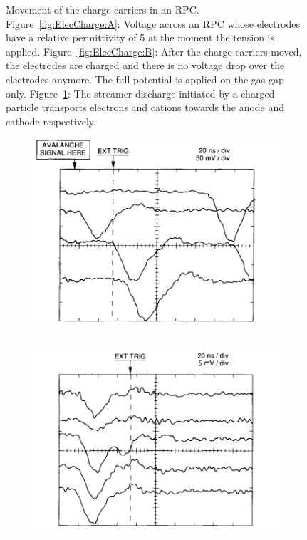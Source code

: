 \begin{figure}[H]
\begin{subfigure}{\linewidth}
			\caption{\label{fig:ElecCharge:C}}
		\end{subfigure}
		\caption{\label{fig:ElecCharge} Movement of the charge carriers in an RPC. Figure~\ref{fig:ElecCharge:A}: Voltage across an RPC whose electrodes have a relative permittivity of 5 at the moment the tension is applied. Figure~\ref{fig:ElecCharge:B}: After the charge carriers moved, the electrodes are charged and there is no voltage drop over the electrodes anymore. The full potential is applied on the gas gap only. Figure~\ref{fig:ElecCharge:C}: The streamer discharge initiated by a charged particle transports electrons and cations towards the anode and cathode respectively.}
	\end{figure}
	
	\begin{figure}[H]
		\begin{subfigure}{0.5\linewidth}
			\centering
			\includegraphics[width = 0.5\plotwidth]{fig/chapt4/RPC_Streamer_Mode.png}
			\caption{\label{fig:ModeSignal:A}}
		\end{subfigure}
		\begin{subfigure}{0.5\linewidth}
			\centering
			\includegraphics[width = 0.5\plotwidth]{fig/chapt4/RPC_Avalanche_Mode.png}\\

\end{subfigure}
\end{figure}
